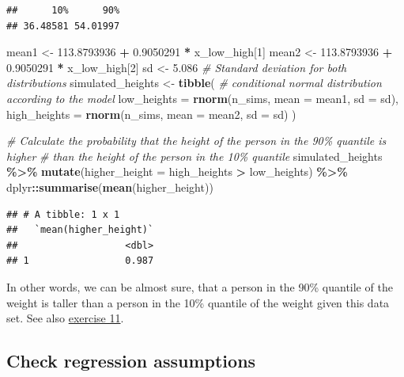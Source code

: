 \documentclass[
]{book}
\newenvironment{Shaded}{\begin{snugshade}}{\end{snugshade}}
\newcommand{\AttributeTok}[1]{\textcolor[rgb]{0.13,0.29,0.53}{#1}}
\newcommand{\CommentTok}[1]{\textcolor[rgb]{0.56,0.35,0.01}{\textit{#1}}}
\newcommand{\DecValTok}[1]{\textcolor[rgb]{0.00,0.00,0.81}{#1}}
\newcommand{\FloatTok}[1]{\textcolor[rgb]{0.00,0.00,0.81}{#1}}
\newcommand{\FunctionTok}[1]{\textcolor[rgb]{0.13,0.29,0.53}{\textbf{#1}}}
\newcommand{\NormalTok}[1]{#1}
\newcommand{\OtherTok}[1]{\textcolor[rgb]{0.56,0.35,0.01}{#1}}
\newcommand{\SpecialCharTok}[1]{\textcolor[rgb]{0.81,0.36,0.00}{\textbf{#1}}}
\begin{document}
\begin{verbatim}
##      10%      90% 
## 36.48581 54.01997
\end{verbatim}

\begin{Shaded}
\begin{Highlighting}[]
\NormalTok{mean1 }\OtherTok{\textless{}{-}} \FloatTok{113.8793936} \SpecialCharTok{+} \FloatTok{0.9050291} \SpecialCharTok{*}\NormalTok{ x\_low\_high[}\DecValTok{1}\NormalTok{]}
\NormalTok{mean2 }\OtherTok{\textless{}{-}} \FloatTok{113.8793936} \SpecialCharTok{+} \FloatTok{0.9050291} \SpecialCharTok{*}\NormalTok{ x\_low\_high[}\DecValTok{2}\NormalTok{]}
\NormalTok{sd }\OtherTok{\textless{}{-}} \FloatTok{5.086}  \CommentTok{\# Standard deviation for both distributions}
\NormalTok{simulated\_heights }\OtherTok{\textless{}{-}} \FunctionTok{tibble}\NormalTok{(}
  \CommentTok{\# conditional normal distribution according to the model}
  \AttributeTok{low\_heights =} \FunctionTok{rnorm}\NormalTok{(n\_sims, }\AttributeTok{mean =}\NormalTok{ mean1, }\AttributeTok{sd =}\NormalTok{ sd),}
  \AttributeTok{high\_heights =} \FunctionTok{rnorm}\NormalTok{(n\_sims, }\AttributeTok{mean =}\NormalTok{  mean2, }\AttributeTok{sd =}\NormalTok{ sd)}
\NormalTok{)}

\CommentTok{\# Calculate the probability that the height of the person in the 90\% quantile is higher}
\CommentTok{\# than the height of the person in the 10\% quantile}
\NormalTok{simulated\_heights }\SpecialCharTok{\%\textgreater{}\%}
  \FunctionTok{mutate}\NormalTok{(}\AttributeTok{higher\_height =}\NormalTok{ high\_heights }\SpecialCharTok{\textgreater{}}\NormalTok{ low\_heights) }\SpecialCharTok{\%\textgreater{}\%}
\NormalTok{  dplyr}\SpecialCharTok{::}\FunctionTok{summarise}\NormalTok{(}\FunctionTok{mean}\NormalTok{(higher\_height))}
\end{Highlighting}
\end{Shaded}

\begin{verbatim}
## # A tibble: 1 x 1
##   `mean(higher_height)`
##                   <dbl>
## 1                 0.987
\end{verbatim}

In other words, we can be almost sure, that a person in the 90\% quantile of the weight
is taller than a person in the 10\% quantile of the weight given this data set.
See also \hyperref[exercise11_simpl_lin_reg]{exercise 11}.

\subsection{Check regression assumptions}\label{check-regression-assumptions}
\end{document}
